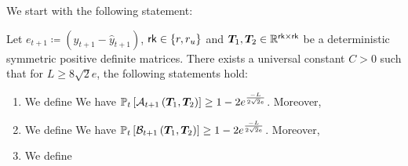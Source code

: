 We start with the following statement:  
\begin{proposition}
\label{prop:noisevarbounds}
Let $e_{t+1} \coloneqq (y_{t+1} - \hat{y}_{t+1})$, $\mathsf{rk} \in \{ r, r_u \}$ and $\boldsymbol{T}_1,  \boldsymbol{T}_2 \in \mathbb{R}^{\mathsf{rk} \times \mathsf{rk}}$ be a deterministic symmetric positive definite matrices.  There exists a universal constant $C > 0$ such that for $L \geq 8 \sqrt{2} e$, the following statements hold:
\begin{enumerate}[leftmargin=*]
\item We define
We have  $\mathbb{P}_t \left[  \mathcal{A}_{t+1} \left(    \boldsymbol{T}_1 ,   \boldsymbol{T}_2  \right)  \right] \geq  1- 2 e^{\frac{- L}{2\sqrt{2}e}}$.  Moreover,   
\item We define
We have  $\mathbb{P}_t \left[  \mathcal{B}_{t+1} \left(    \boldsymbol{T}_1 ,   \boldsymbol{T}_2  \right)  \right] \geq  1- 2 e^{\frac{- L}{2 \sqrt{2} e}}$.  Moreover,   
\item We define
{\small  {}}
\end{enumerate}
\end{proposition}
